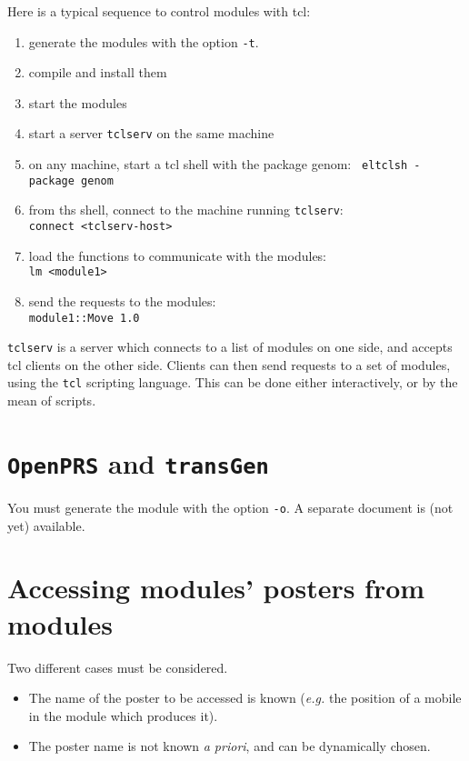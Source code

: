 Here is a typical sequence to control modules with tcl:

\begin{enumerate}
\item generate the modules with the  option {\tt -t}. 
\item compile and install them
\item start the modules
\item start a server {\tt tclserv} on the same machine
\item on any machine, start a tcl shell with the package genom: {\tt
      eltclsh -package genom}
\item from ths shell, connect to the machine running {\tt tclserv}:\\
	{\tt connect <tclserv-host>}
\item load the functions to communicate with the modules:\\
	{\tt lm <module1>}
\item send the requests to the modules:\\
	{\tt module1::Move 1.0}
\end{enumerate}


{\tt tclserv} is  a server which  connects to  a  list of modules on  one
side, and accepts  tcl clients on  the other side.  Clients can then send
requests to  a   set   of   modules,  using the    {\tt  tcl}   scripting
language. This  can  be done  either interactively,  or  by the  mean  of
scripts.



\section{{\tt OpenPRS} and {\tt transGen}}
\label{sec|propice}

You must generate the module with the option {\tt -o}.
A separate document is (not yet) available.


\section{Accessing modules' posters from modules}
\label{sec|posters}

Two different cases must be considered.
\begin{itemize}
\item The name of the poster to be accessed is known ({\em e.g.} the
position of a mobile in the module which produces it).
\item The poster name is not known {\em a priori}, and can be dynamically
chosen.
\end{itemize}

